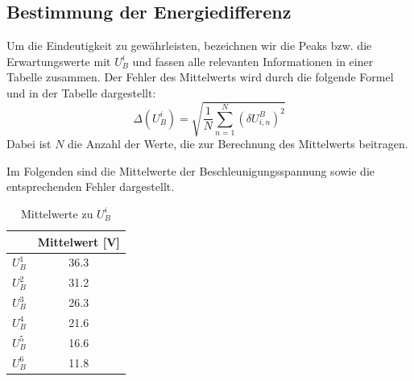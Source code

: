 \documentclass{article}
\begin{document}
\begin{multicols}{2}
\subsection*{Bestimmung der Energiedifferenz}
Um die Eindeutigkeit zu gewährleisten, bezeichnen wir die Peaks bzw. die Erwartungswerte mit $U^i_B$ und 
fassen alle relevanten Informationen in einer Tabelle zusammen.
Der Fehler des Mittelwerts wird durch die folgende Formel und in der Tabelle dargestellt:
\begin{equation*}
\Delta(U^i_B) = \sqrt{\frac{1}{N} \sum_{n=1}^{N} \left( \delta U_{i,n}^B \right)^2}
\end{equation*}
Dabei ist \( N \) die Anzahl der Werte, die zur Berechnung des Mittelwerts beitragen.

Im Folgenden sind die Mittelwerte der Beschleunigungsspannung sowie die entsprechenden Fehler dargestellt.
\begin{table}[H]
  \centering
  \begin{tabular}{cc} 
      \hline
      & Mittelwert [V] \\ \hline
      $U^1_B$ & 36.3 \\ \hline
      $U^2_B$ & 31.2 \\ \hline
      $U^3_B$ & 26.3 \\ \hline
      $U^4_B$ & 21.6 \\ \hline
      $U^5_B$ & 16.6 \\ \hline
      $U^6_B$ & 11.8 \\ \hline
  \end{tabular}
  \caption{Mittelwerte zu $U^i_B$}
  \label{tab:median_values}
\end{table}


\end{multicols}
\end{document}
